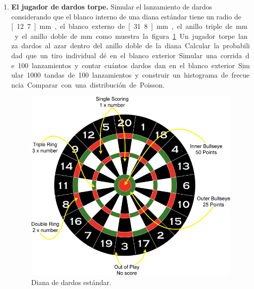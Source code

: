 \documentclass[a4paper,11pt]{article}
\begin{document}
\begin{enumerate}
\item \textbf{El jugador de dardos torpe.} Simular el lanzamiento de dardos considerando que el blanco interno de una diana estándar tiene un radio de \unit[12.7]{mm}, el blanco externo de \unit[31.8]{mm}, el anillo triple de \unit[107]{mm} y el anillo doble de \unit[170]{mm} como muestra la figura \ref{fig:dartboard}. Un jugador torpe lanza dardos al azar dentro del anillo doble de la diana. Calcular la probabilidad que un tiro individual dé en el blanco exterior. Simular una  corrida de 100 lanzamientos y contar cuántos dardos dan en el blanco exterior. Simular 1000 tandas de 100 lanzamientos y construir un histograma de frecuencia. Comparar con una distribución de Poisson.


\begin{figure} [htp]
\centering
\setlength{\abovecaptionskip}{0pt}
\includegraphics[width=.6\textwidth]{kindpng_1767452}
\caption{Diana de dardos estándar. \label{fig:dartboard}}
\end{figure}




\end{enumerate}
\end{document}
